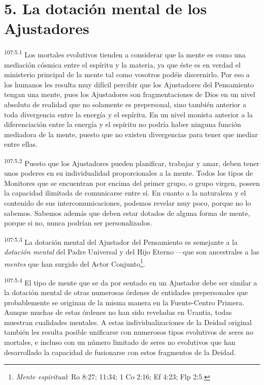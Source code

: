 \section*{5. La dotación mental de los Ajustadores}
\par
\textsuperscript{107:5.1} Los mortales evolutivos tienden a considerar que la mente es como una mediación cósmica entre el espíritu y la materia, ya que éste es en verdad el ministerio principal de la mente tal como vosotros podéis discernirlo. Por eso a los humanos les resulta muy difícil percibir que los Ajustadores del Pensamiento tengan una mente, pues los Ajustadores son fragmentaciones de Dios en un nivel absoluto de realidad que no solamente es prepersonal, sino también anterior a toda divergencia entre la energía y el espíritu. En un nivel monista anterior a la diferenciación entre la energía y el espíritu no podría haber ninguna función mediadora de la mente, puesto que no existen divergencias para tener que mediar entre ellas.

\par
\textsuperscript{107:5.2} Puesto que los Ajustadores pueden planificar, trabajar y amar, deben tener unos poderes en su individualidad proporcionales a la mente. Todos los tipos de Monitores que se encuentran por encima del primer grupo, o grupo virgen, poseen la capacidad ilimitada de comunicarse entre sí. En cuanto a la naturaleza y el contenido de sus intercomunicaciones, podemos revelar muy poco, porque no lo sabemos. Sabemos además que deben estar dotados de alguna forma de mente, porque si no, nunca podrían ser personalizados.

\par
\textsuperscript{107:5.3} La dotación mental del Ajustador del Pensamiento es semejante a la \textit{dotación mental} del Padre Universal y del Hijo Eterno ---que son ancestrales a las \textit{mentes} que han surgido del Actor Conjunto\footnote{\textit{Mente espiritual}: Ro 8:27; 11:34; 1 Co 2:16; Ef 4:23; Flp 2:5.}.

\par
\textsuperscript{107:5.4} El tipo de mente que se da por sentado en un Ajustador debe ser similar a la dotación mental de otras numerosas órdenes de entidades prepersonales que probablemente se originan de la misma manera en la Fuente-Centro Primera. Aunque muchas de estas órdenes no han sido reveladas en Urantia, todas muestran cualidades mentales. A estas individualizaciones de la Deidad original también les resulta posible unificarse con numerosos tipos evolutivos de seres no mortales, e incluso con un número limitado de seres no evolutivos que han desarrollado la capacidad de fusionarse con estos fragmentos de la Deidad.

